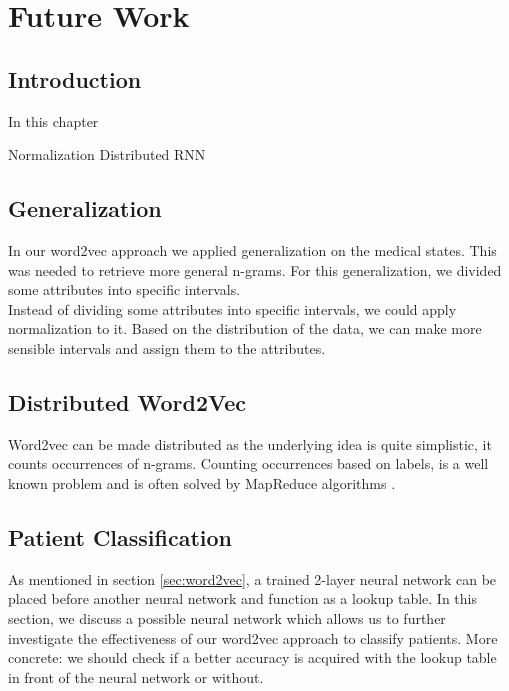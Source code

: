 \graphicspath{ {FutureWork/Images/} }


\chapter{Future Work}
\label{cha:futureWork}

\section{Introduction}
In this chapter 

Normalization
Distributed
RNN


\section{Generalization}

In our word2vec approach we applied generalization on the medical states. This was needed to retrieve more general n-grams. For this generalization, we divided some attributes into specific intervals. \\

Instead of dividing some attributes into specific intervals, we could apply normalization to it. Based on the distribution of the data, we can make more sensible intervals and assign them to the attributes.


\section{Distributed Word2Vec}

Word2vec can be made distributed as the underlying idea is quite simplistic, it counts occurrences of n-grams. Counting occurrences based on labels, is a well known problem and is often solved by MapReduce algorithms \cite{mapreduce:article}. 


\section{Patient Classification}
\label{sec:PatientClassification}

As mentioned in section \ref{sec:word2vec}, a trained 2-layer neural network can be placed before another neural network and function as a lookup table. In this section, we discuss a possible neural network which allows us to further investigate the effectiveness of our word2vec approach to classify patients. More concrete: we should check if a better accuracy is acquired with the lookup table in front of the neural network or without. 

